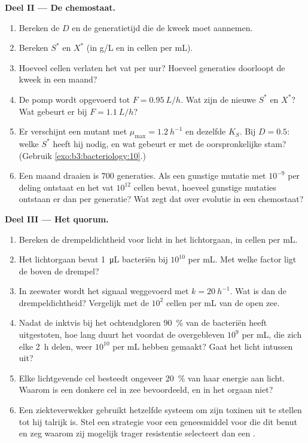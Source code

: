 \begin{problem}
\medskip
\noindent\textbf{Deel II --- De chemostaat.}
\begin{enumerate}[resume]
  \item Bereken de  $D$ en de generatietijd die de
        kweek moet aannemen.
  \item Bereken $S^{*}$ en $X^{*}$ (in g/L en in cellen per mL).
  \item Hoeveel cellen verlaten het vat per uur? Hoeveel generaties
        doorloopt de kweek in een maand?
  \item De pomp wordt opgevoerd tot $F = \qty{0.95}{L/h}$. Wat zijn de
        nieuwe $S^{*}$ en $X^{*}$? Wat gebeurt er bij
        $F = \qty{1.1}{L/h}$?
  \item Er verschijnt een mutant met $\mu_{\max} = \qty{1.2}{h^{-1}}$ en
        dezelfde $K_{S}$. Bij $D = 0.5$: welke $S^{*}$ heeft hij nodig,
        en wat gebeurt er met de oorspronkelijke stam? (Gebruik
        \cref{exo:b3:bacteriology:10}.)
  \item Een maand draaien is $700$ generaties. Als een gunstige mutatie
        met $10^{-9}$ per deling ontstaat en het vat $10^{12}$ cellen
        bevat, hoeveel gunstige mutaties ontstaan er dan per generatie?
        Wat zegt dat over evolutie in een chemostaat?
\end{enumerate}

\medskip
\noindent\textbf{Deel III --- Het quorum.}
\begin{enumerate}[resume]
  \item Bereken de drempeldichtheid voor licht in het lichtorgaan, in
        cellen per mL.
  \item Het lichtorgaan bevat \qty{1}{\micro L} bacteriën bij $10^{10}$
        per mL. Met welke factor ligt de  boven de drempel?
  \item In zeewater wordt het signaal weggevoerd met
        $k = \qty{20}{h^{-1}}$. Wat is dan de drempeldichtheid?
        Vergelijk met de $10^{2}$ cellen per mL van de open zee.
  \item Nadat de inktvis bij het ochtendgloren \qty{90}{\%} van de
        bacteriën heeft uitgestoten, hoe lang duurt het voordat de
        overgebleven $10^{9}$ per mL, die zich elke \qty{2}{h} delen,
        weer $10^{10}$ per mL hebben gemaakt? Gaat het licht intussen
        uit?
  \item Elke lichtgevende cel besteedt ongeveer \qty{20}{\%} van haar
        energie aan licht. Waarom is een donkere cel in zee
        bevoordeeld, en in het orgaan niet?
  \item Een ziekteverwekker gebruikt hetzelfde systeem om zijn toxinen
        uit te stellen tot hij talrijk is. Stel een strategie voor een
        geneesmiddel voor die dit benut en zeg waarom zij mogelijk
        trager resistentie selecteert dan een .
\end{enumerate}


\end{problem}
